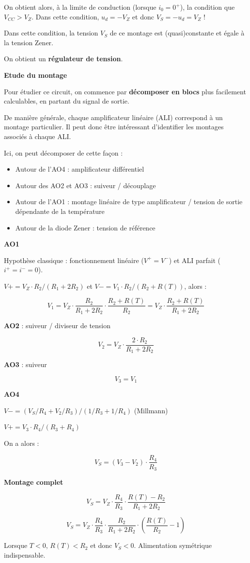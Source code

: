 \documentclass[a4paper,french]{paper}
\begin{document}
On obtient alors, à la limite de conduction (lorsque $i_0 = 0^+$), la condition que $V_{CC} > V_Z$. Dans cette condition, $u_d = -V_Z$ et donc $V_S = -u_d = V_Z$ !

Dans cette condition, la tension $V_S$ de ce montage est (quasi)constante et égale à la tension Zener.

On obtient un \textbf{régulateur de tension}.


\textbf{Etude du montage}

Pour étudier ce circuit, on commence par \textbf{décomposer en blocs} plus facilement calculables, en partant du signal de sortie.

De manière générale, chaque amplificateur linéaire (ALI) correspond à un montage particulier. Il peut donc être intéressant d'identifier les montages associés à chaque ALI.

Ici, on peut décomposer de cette façon : 
\begin{itemize}
	\item Autour de l'AO4 : amplificateur différentiel 
	\item Autour des AO2 et AO3 : suiveur / découplage
	\item Autour de l'AO1 : montage linéaire de type amplificateur / tension de sortie dépendante de la température
	\item Autour de la diode Zener : tension de référence	
\end{itemize}


\textbf{AO1} 

Hypothèse classique : fonctionnement linéaire ($V^+ = V^-$) et ALI parfait ($i^+ = i^- = 0$).

$V+ = V_Z \cdot R_2 / (R_1 + 2 R_2)$ et $V- = V_1 \cdot R_2 / (R_2 + R(T))$, alors : 

$$V_1 = V_Z \cdot \frac{R_2}{R_1 + 2 R_2} \cdot \frac{R_2 + R(T)}{R_2} = V_Z \cdot \frac{R_2 + R(T)}{R_1 + 2 R_2}$$

\textbf{AO2} : suiveur / diviseur de tension

$$V_2 =  V_Z \cdot \frac{2 \cdot R_2}{R_1 + 2 R_2}$$

\textbf{AO3} : suiveur

$$V_3 = V_1$$

\textbf{AO4} 

$V- = (V_S/R_4 + V_2/R_3) / (1/R_3 + 1/R_4)$ (Millmann)

$V+ = V_3 \cdot R_4 / (R_3 + R_4)$

On a alors : 

$$V_S = (V_3 - V_2) \cdot \frac{R_4}{R_3}$$


\textbf{Montage complet}

$$V_S = V_Z \cdot \frac{R_4}{R_3} \cdot \frac{R(T) - R_2}{R_1 + 2 R_2}$$

$$V_S = V_Z \cdot \frac{R_4}{R_3} \cdot \frac{R_2}{R_1 + 2 R_2} \cdot (\frac{R(T)}{R_2} - 1)$$


Lorsque $T < 0$, $R(T) < R_2$ et donc $V_S < 0$. Alimentation symétrique indispensable.




\end{document}
